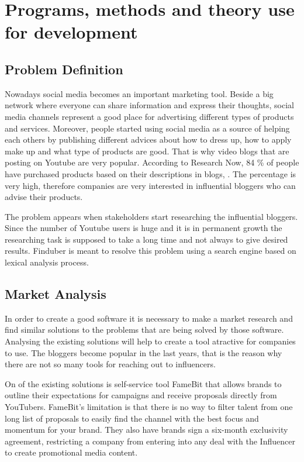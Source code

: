\section{Programs, methods and theory use for development}

\subsection{Problem Definition}

Nowadays social media becomes an important marketing tool. Beside a big network where everyone can share information and express their thoughts, social media channels represent a good place for advertising different types of products and services. Moreover, people started using social media as a source of helping each others by publishing different advices about how to dress up, how to apply make up and what type of products are good. That is why video blogs that are posting on Youtube are very popular. According to Research Now, 84 \% of people have purchased products based on their descriptions in blogs, \cite{cyber}. The percentage is very high, therefore companies are very interested in influential bloggers who can advise their products. 

The problem appears when stakeholders start researching the influential bloggers. Since the number of Youtube users is huge and it is in permanent growth the researching task is supposed to take a long time and not always to give desired results. Finduber is meant to resolve this problem using a search engine based on lexical analysis process. 

\subsection{Market Analysis}

In order to create a good software it is necessary to make a market research and find similar solutions to the problems that are being solved by those software. Analysing the existing solutions will help to create a tool atractive for companies to use. The bloggers become popular in the last years, that is the reason why there are not so many tools for reaching out to influencers.

On of the existing solutions is self-service tool FameBit that allows brands to outline their expectations for campaigns and receive proposals directly from YouTubers. FameBit’s limitation is that there is no way to filter talent from one long list of proposals to easily find the channel with the best focus and momentum for your brand. They also have brands sign a six-month exclusivity agreement, restricting a company from entering into any deal with the Influencer to create promotional media content.

